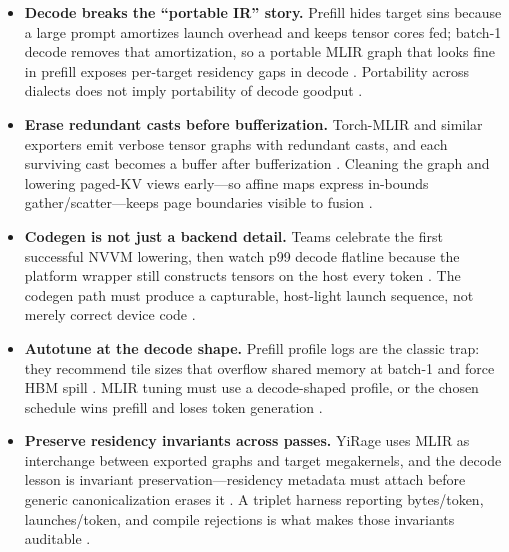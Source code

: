 \begin{itemize}
\item \textbf{Decode breaks the ``portable IR'' story.}
Prefill hides target sins because a large prompt amortizes launch overhead and keeps tensor cores fed; batch-1 decode removes that amortization, so a portable MLIR graph that looks fine in prefill exposes per-target residency gaps in decode \citep{dao2022flashattention,patel2025llminference}. Portability across dialects does not imply portability of decode goodput \citep{taxbreak2026}.

\item \textbf{Erase redundant casts before bufferization.}
Torch-MLIR and similar exporters emit verbose tensor graphs with redundant casts, and each surviving cast becomes a buffer after bufferization \citep{chen2020compilerbasedhardw,yirage2026}. Cleaning the graph and lowering paged-KV views early---so affine maps express in-bounds gather/scatter---keeps page boundaries visible to fusion \citep{kwon2023vllm,dao2022flashattention}.

\item \textbf{Codegen is not just a backend detail.}
Teams celebrate the first successful NVVM lowering, then watch p99 decode flatline because the platform wrapper still constructs tensors on the host every token \citep{taxbreak2026,nvidia2024cudagraphs}. The codegen path must produce a capturable, host-light launch sequence, not merely correct device code \citep{memoryfloor2026}.

\item \textbf{Autotune at the decode shape.}
Prefill profile logs are the classic trap: they recommend tile sizes that overflow shared memory at batch-1 and force HBM spill \citep{memoryfloor2026,semianalysis2024tma}. MLIR tuning must use a decode-shaped profile, or the chosen schedule wins prefill and loses token generation \citep{patel2025llminference}.

\item \textbf{Preserve residency invariants across passes.}
YiRage uses MLIR as interchange between exported graphs and target megakernels, and the decode lesson is invariant preservation---residency metadata must attach before generic canonicalization erases it \citep{yirage2026,chen2020compilerbasedhardw}. A triplet harness reporting bytes/token, launches/token, and compile rejections is what makes those invariants auditable \citep{memoryfloor2026,taxbreak2026}.
\end{itemize}

